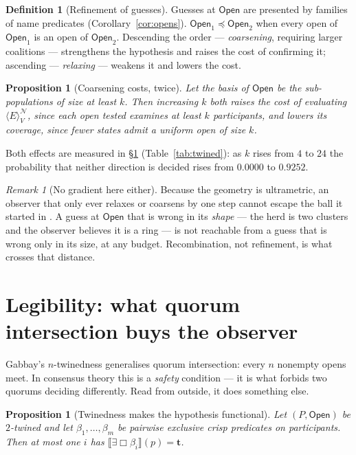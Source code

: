 \documentclass[11pt,a4paper]{article}
\theoremstyle{plain}
\newtheorem{proposition}[theorem]{Proposition}
\theoremstyle{definition}
\newtheorem{definition}[theorem]{Definition}
\theoremstyle{remark}
\newtheorem{remark}[theorem]{Remark}
\newcommand{\Open}{\mathsf{Open}}
\newcommand{\Ebox}{\exists\Box}
\newcommand{\gE}[2]{\langle E\rangle^{#1}_{#2}}
\newcommand{\Nsp}{\mathcal{N}}
\newcommand{\Val}{V}
\newcommand{\sem}[1]{\llbracket #1 \rrbracket}
\newcommand{\tv}{\mathbf{t}}
\begin{document}
\begin{definition}[Refinement of guesses]\label{def:refine}
Guesses at $\Open$ are presented by families of name predicates
(Corollary~\ref{cor:opens}). $\Open_1 \preceq \Open_2$ when every open of
$\Open_1$ is an open of $\Open_2$. Descending the order --- \emph{coarsening},
requiring larger coalitions --- strengthens the hypothesis and raises the cost
of confirming it; ascending --- \emph{relaxing} --- weakens it and lowers the
cost.
\end{definition}

\begin{proposition}[Coarsening costs, twice]\label{prop:coarsecost}
Let the basis of $\Open$ be the sub-populations of size at least $k$. Then
increasing $k$ both raises the cost of evaluating $\gE{\Nsp}{\Val}$, since each
open tested examines at least $k$ participants, and lowers its coverage, since
fewer states admit a uniform open of size $k$.
\end{proposition}

Both effects are measured in \S\ref{sec:legibility} (Table~\ref{tab:twined}):
as $k$ rises from $4$ to $24$ the probability that neither direction is decided
rises from $0.0000$ to $0.9252$.

\begin{remark}[No gradient here either]
Because the geometry is ultrametric, an observer that only ever relaxes or
coarsens by one step cannot escape the ball it started in
\cite[Prop.~Confinement]{scientist}. A guess at $\Open$ that is wrong in its
\emph{shape} --- the herd is two clusters and the observer believes it is a
ring --- is not reachable from a guess that is wrong only in its size, at any
budget. Recombination, not refinement, is what crosses that distance.
\end{remark}

\section{Legibility: what quorum intersection buys the observer}
\label{sec:legibility}

Gabbay's $n$-twinedness generalises quorum intersection: every $n$ nonempty
opens meet. In consensus theory this is a \emph{safety} condition --- it is what
forbids two quorums deciding differently. Read from outside, it does something
else.

\begin{proposition}[Twinedness makes the hypothesis functional]
\label{prop:functional}
Let $(P,\Open)$ be $2$-twined and let $\beta_1,\dots,\beta_m$ be pairwise
exclusive crisp predicates on participants. Then at most one $i$ has
$\sem{\Ebox\beta_i}(p) = \tv$.
\end{proposition}
\end{document}

